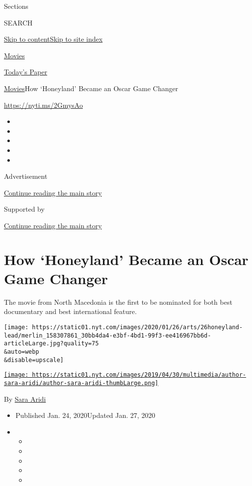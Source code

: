 Sections

SEARCH

\protect\hyperlink{site-content}{Skip to
content}\protect\hyperlink{site-index}{Skip to site index}

\href{https://www.nytimes.com/section/movies}{Movies}

\href{https://myaccount.nytimes.com/auth/login?response_type=cookie\&client_id=vi}{}

\href{https://www.nytimes.com/section/todayspaper}{Today's Paper}

\href{/section/movies}{Movies}\textbar{}How `Honeyland' Became an Oscar
Game Changer

\href{https://nyti.ms/2GmysAo}{https://nyti.ms/2GmysAo}

\begin{itemize}
\item
\item
\item
\item
\item
\end{itemize}

Advertisement

\protect\hyperlink{after-top}{Continue reading the main story}

Supported by

\protect\hyperlink{after-sponsor}{Continue reading the main story}

\hypertarget{how-honeyland-became-an-oscar-game-changer}{%
\section{How `Honeyland' Became an Oscar Game
Changer}\label{how-honeyland-became-an-oscar-game-changer}}

The movie from North Macedonia is the first to be nominated for both
best documentary and best international feature.

\texttt{[image: https://static01.nyt.com/images/2020/01/26/arts/26honeyland-lead/merlin\_158307861\_30bb4da4-e3bf-4bd1-99f3-ee416967bb6d-articleLarge.jpg?quality=75\\\&auto=webp\\\&disable=upscale]}

\href{https://www.nytimes.com/by/sara-aridi}{\texttt{[image: https://static01.nyt.com/images/2019/04/30/multimedia/author-sara-aridi/author-sara-aridi-thumbLarge.png]}}

By \href{https://www.nytimes.com/by/sara-aridi}{Sara Aridi}

\begin{itemize}
\item
  Published Jan. 24, 2020Updated Jan. 27, 2020
\item
  \begin{itemize}
  \item
  \item
  \item
  \item
  \item
  \end{itemize}
\end{itemize}

